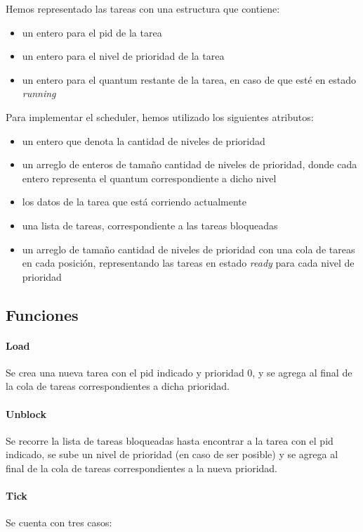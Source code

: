 Hemos representado las tareas con una estructura que contiene:

\begin{itemize}
\item un entero para el pid de la tarea
\item un entero para el nivel de prioridad de la tarea
\item un entero para el quantum restante de la tarea, en caso de que esté en estado {\it running}
\end{itemize}

Para implementar el scheduler, hemos utilizado los siguientes atributos:

\begin{itemize}
\item un entero que denota la cantidad de niveles de prioridad
\item un arreglo de enteros de tamaño cantidad de niveles de prioridad, donde cada entero representa el quantum correspondiente a dicho nivel
\item los datos de la tarea que está corriendo actualmente
\item una lista de tareas, correspondiente a las tareas bloqueadas
\item un arreglo de tamaño cantidad de niveles de prioridad con una cola de tareas en cada posición, representando las tareas en estado {\it ready} para cada nivel de prioridad
\end{itemize}

\subsection{Funciones}

\paragraph{Load} Se crea una nueva tarea con el pid indicado y prioridad 0, y se agrega al final de la cola de tareas correspondientes a dicha prioridad.

\paragraph{Unblock} Se recorre la lista de tareas bloqueadas hasta encontrar a la tarea con el pid indicado, se sube un nivel de prioridad (en caso de ser posible) y se agrega al final de la cola de tareas correspondientes a la nueva prioridad.

\paragraph{Tick} Se cuenta con tres casos:

